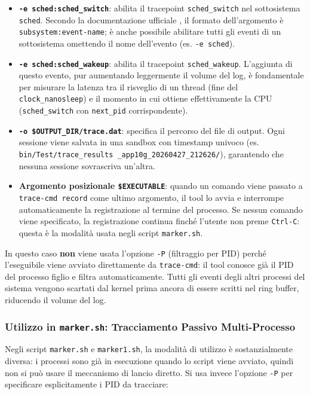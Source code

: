 \begin{itemize}
	\item \textbf{\texttt{-e sched:sched\_switch}}: abilita il tracepoint \texttt{sched\_switch} nel sottosistema \texttt{sched}. Secondo la documentazione ufficiale \cite{tracecmd_record_man}, il formato dell'argomento è \texttt{subsystem:event-name}; è anche possibile abilitare tutti gli eventi di un sottosistema omettendo il nome dell'evento (es. \texttt{-e sched}).
	
	\item \textbf{\texttt{-e sched:sched\_wakeup}}: abilita il tracepoint \texttt{sched\_wakeup}. L'aggiunta di questo evento, pur aumentando leggermente il volume del log, è fondamentale per misurare la latenza tra il risveglio di un thread (fine del \texttt{clock\_nanosleep}) e il momento in cui ottiene effettivamente la CPU (\texttt{sched\_switch} con \texttt{next\_pid} corrispondente).
	
	\item \textbf{\texttt{-o \$OUTPUT\_DIR/trace.dat}}: specifica il percorso del file di output. Ogni sessione viene salvata in una sandbox con timestamp univoco (es. \texttt{bin/Test/trace\_results
		\_app10g\_20260427\_212626/}), garantendo che nessuna sessione sovrascriva un'altra.
	
	\item \textbf{Argomento posizionale \texttt{\$EXECUTABLE}}: quando un comando viene passato a \texttt{trace-cmd record} come ultimo argomento, il tool lo avvia e interrompe automaticamente la registrazione al termine del processo. Se nessun comando viene specificato, la registrazione continua finché l'utente non preme \texttt{Ctrl-C}: questa è la modalità usata negli script \texttt{marker.sh}.
\end{itemize}

In questo caso \textbf{non} viene usata l'opzione \texttt{-P} (filtraggio per PID) perché l'eseguibile viene avviato direttamente da \texttt{trace-cmd}: il tool conosce già il PID del processo figlio e filtra automaticamente. Tutti gli eventi degli altri processi del sistema vengono scartati dal kernel prima ancora di essere scritti nel ring buffer, riducendo il volume del log.

\subsubsection{Utilizzo in \texttt{marker.sh}: Tracciamento Passivo Multi-Processo}

Negli script \texttt{marker.sh} e \texttt{marker1.sh}, la modalità di utilizzo è sostanzialmente diversa: i processi sono già in esecuzione quando lo script viene avviato, quindi non si può usare il meccanismo di lancio diretto. Si usa invece l'opzione \texttt{-P} per specificare esplicitamente i PID da tracciare:

